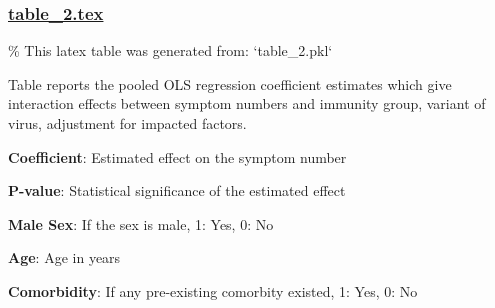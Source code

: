 \documentclass[11pt]{article}
\begin{document}
\subsubsection*{\hyperlink{code-LaTeX Table Design-table-2-tex}{table\_2.tex}}

\begin{codeoutput}
\% This latex table was generated from: `table\_2.pkl`
\begin{table}[h]
\caption{Model estimates for interaction effects}
\label{table:interaction\_effects}
\begin{threeparttable}
\renewcommand{\TPTminimum}{\linewidth}
\begin{tablenotes}
\footnotesize
\item Table reports the pooled OLS regression coefficient estimates which give interaction effects between symptom numbers and immunity group, variant of virus, adjustment for impacted factors.
\item \textbf{Coefficient}: Estimated effect on the symptom number
\item \textbf{P-value}: Statistical significance of the estimated effect
\item \textbf{Male Sex}: If the sex is male, 1: Yes, 0: No
\item \textbf{Age}: Age in years
\item \textbf{Comorbidity}: If any pre-existing comorbity existed, 1: Yes, 0: No

\end{tablenotes}
\end{threeparttable}
\end{table}
\end{codeoutput}
\end{document}

